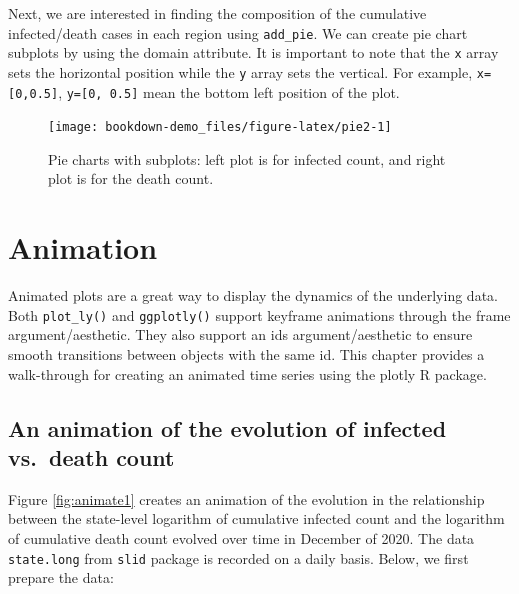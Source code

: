 \documentclass[]{book}
\begin{document}
Next, we are interested in finding the composition of the cumulative
infected/death cases in each region using \texttt{add\_pie}. We can
create pie chart subplots by using the domain attribute. It is important
to note that the \texttt{x} array sets the horizontal position while the
\texttt{y} array sets the vertical. For example, \texttt{x={[}0,0.5{]}},
\texttt{y={[}0,\ 0.5{]}} mean the bottom left position of the plot.

\begin{figure}

{\centering \texttt{[image: bookdown-demo\_files/figure-latex/pie2-1]} 

}

\caption{Pie charts with subplots: left plot is for infected count, and right plot is for the death count.}\label{fig:pie2}
\end{figure}

\section{Animation}\label{animation}

Animated plots are a great way to display the dynamics of the underlying
data. Both \texttt{plot\_ly()} and \texttt{ggplotly()} support keyframe
animations through the frame argument/aesthetic. They also support an
ids argument/aesthetic to ensure smooth transitions between objects with
the same id. This chapter provides a walk-through for creating an
animated time series using the plotly R package.

\subsection{An animation of the evolution of infected vs.~death
count}\label{an-animation-of-the-evolution-of-infected-vs.death-count}

Figure \ref{fig:animate1} creates an animation of the evolution in the
relationship between the state-level logarithm of cumulative infected
count and the logarithm of cumulative death count evolved over time in
December of 2020. The data \texttt{state.long} from \texttt{slid}
package is recorded on a daily basis. Below, we first prepare the data:
\end{document}

